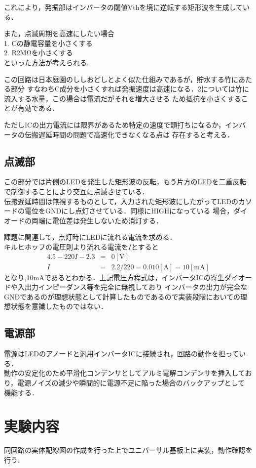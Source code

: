 \documentclass[titlepage]{jarticle}
\begin{document}
これにより，発振部はインバータの閾値Vthを境に逆転する矩形波を生成している．

また，点滅周期を高速にしたい場合\\
1. Cの静電容量を小さくする\\
2. R2MΩを小さくする\\
といった方法が考えられる.

この回路は日本庭園のししおどしとよく似た仕組みであるが，貯水する竹にあたる部分
すなわちC成分を小さくすれば発振速度は高速になる．2については竹に流入する水量，この場合は電流だがそれを増大させる
ため抵抗を小さくすることが有効である．

ただしICの出力電流には限界があるため特定の速度で頭打ちになるか，インバータの伝搬遅延時間の問題で高速化できなくなる点は
存在すると考える．

\subsection{点滅部}
この部分では片側のLEDを発生した矩形波の反転，もう片方のLEDを二重反転で制御することにより交互に点滅させている．\\
伝搬遅延時間は無視するものとして，入力された矩形波にしたがってLEDのカソードの電位をGNDにし点灯させている．同様にHIGHになっている
場合，ダイオードの両端に電位差は発生しないため消灯する．

課題に関連して，点灯時にLEDに流れる電流を求める．\\
キルヒホッフの電圧則より流れる電流を$I$とすると
\begin{eqnarray}
    4.5-220I-2.3 &=& 0 [\mathrm{V}]\\
    I &=& 2.2/220 = 0.010 [\mathrm{A}] = 10 [\mathrm{mA}]
\end{eqnarray}
となり,10mAであるとわかる．上記電圧方程式は，インバータICの寄生ダイオードや入出力インピーダンス等を完全に無視しており
インバータの出力が完全なGNDであるのが理想状態として計算したものであるので実装段階においての理想状態を意識したものではない．

\subsection{電源部}
電源はLEDのアノードと汎用インバータICに接続され，回路の動作を担っている．\\
動作の安定化のため平滑化コンデンサとしてアルミ電解コンデンサを挿入しており，電源ノイズの減少や瞬間的に電源不足に陥った場合のバックアップとして
機能する．

\section{実験内容}
同回路の実体配線図の作成を行った上でユニバーサル基板上に実装，動作確認を行う．
\end{document}
